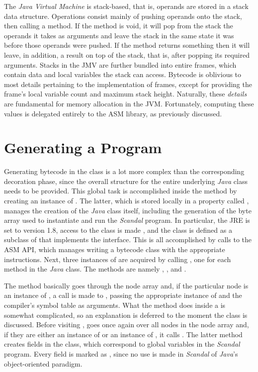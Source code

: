 The \emph{Java Virtual Machine} is stack-based, that is, operands are stored in a stack data structure. Operations consist mainly of pushing operands onto the stack, then calling a method. If the method is void, it will pop from the stack the operands it takes as arguments and leave the stack in the same state it was before those operands were pushed. If the method returns something then it will leave, in addition, a result on top of the stack, that is, after popping its required arguments. Stacks in the JMV are further bundled into entire frames, which contain data and local variables the stack can access. Bytecode is oblivious to most details pertaining to the implementation of frames, except for providing the frame's local variable count and maximum stack height. Naturally, these \emph{details} are fundamental for memory allocation in the JVM. Fortunately, computing these values is delegated entirely to the ASM library, as previously discussed.

\section{Generating a Program}

Generating bytecode in the  class is a lot more complex than the corresponding decoration phase, since the overall structure for the entire underlying \emph{Java} class needs to be provided. This global task is accomplished inside the  method by creating an instance of . The latter, which is stored locally in a property called , manages the creation of the \emph{Java} class itself, including the generation of the byte array used to instantiate and run the \emph{Scandal} program. In particular, the JRE is set to version 1.8, access to the class is made , and the class is defined as a subclass of  that implements the  interface. This is all accomplished by calls to the ASM API, which manages writing a bytecode class with the appropriate instructions. Next, three instances of  are acquired by calling , one for each method in the \emph{Java} class. The methods are namely , , and .

The  method basically goes through the node array and, if the particular node is an instance of , a call is made to , passing the appropriate instance of  and the compiler's symbol table as arguments. What the  method does inside a  is somewhat complicated, so an explanation is deferred to the moment the  class is discussed. Before visiting ,  goes once again over all nodes in the node array and, if they are either an instance of  or an instance of , it calls . The latter method creates fields in the  class, which correspond to global variables in the \emph{Scandal} program. Every field is marked as , since no use is made in \emph{Scandal} of \emph{Java}'s object-oriented paradigm.


